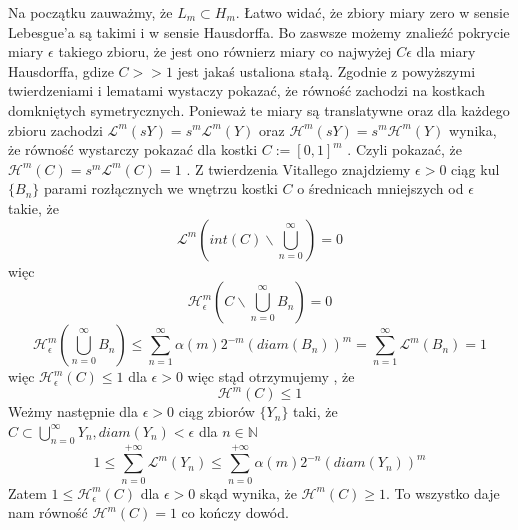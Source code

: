 Na początku zauważmy, że $L_m \subset H_m$. Łatwo widać, że zbiory miary zero w sensie Lebesgue'a są takimi i w sensie Hausdorffa. 
Bo zaswsze możemy znalieźć pokrycie miary $\epsilon$ takiego zbioru, że jest ono równierz miary co najwyżej $C \epsilon$ dla miary
Hausdorffa, gdize $C >> 1$ jest jakaś ustaliona stałą. Zgodnie z powyższymi twierdzeniami i lematami wystaczy pokazać, że równość 
zachodzi na kostkach domkniętych symetrycznych. Ponieważ te miary są translatywne oraz dla każdego zbioru zachodzi 
$\mathcal{L}^m(sY) = s^m\mathcal{L}^m(Y)$ oraz  $\mathcal{H}^m(sY) = s^m\mathcal{H}^m(Y)$  wynika, że równość wystarczy 
pokazać dla kostki $C:= [0,1]^m$ . Czyli pokazać, że $\mathcal{H}^m(C) = s^m\mathcal{L}^m(C) = 1$ . Z twierdzenia Vitallego 
znajdziemy $\epsilon > 0$ ciąg kul $\{B_n\}$ parami rozłącznych we wnętrzu kostki $C$ o średnicach mniejszych od $\epsilon$ 
takie, że 
$$ 
    \mathcal{L}^m(int(C) \backslash \bigcup_{n=0}^{\infty}) = 0 
$$ 
więc 
$$ 
    \mathcal{H}^m_{\epsilon}(C \backslash \bigcup_{n=0}^{\infty} B_n) = 0 
$$ 
$$ 
    \mathcal{H}^m_{\epsilon}(\bigcup_{n=0}^{\infty} B_n) 
    \leq \sum_{n=1}^{\infty} \alpha(m)2^{-m}(diam(B_n))^m 
    = \sum_{n=1}^{\infty} \mathcal{L}^m(B_n) 
    = 1
$$ 
więc $\mathcal{H}^m_{\epsilon}(C) \leq 1$ dla $\epsilon > 0$ więc stąd otrzymujemy , że 
$$\mathcal{H}^m(C) \leq 1 $$ 
Weżmy następnie dla $\epsilon >0 $ ciąg zbiorów $\{Y_n\}$ taki, że 
$C \subset \bigcup_{n=0}^{\infty} Y_n, diam(Y_n) < \epsilon$ dla $n \in \mathbb{N}$ 
$$ 
    1 
    \leq \sum_{n=0}^{+\infty} \mathcal{L}^m(Y_n) 
    \leq \sum_{n=0}^{+\infty} \alpha(m)2^{-n}(diam(Y_n))^m 
$$ 
Zatem $1 \leq \mathcal{H}^m_{\epsilon}(C)$ dla $\epsilon > 0$ skąd wynika, że 
$\mathcal{H}^m(C) \geq 1$. To wszystko daje nam równość 
$\mathcal{H}^m(C) = 1$ co kończy dowód.